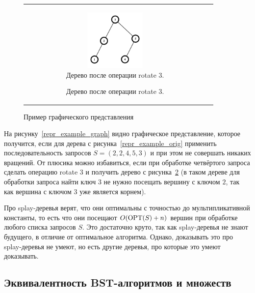 \begin{figure}
\begin{tabular}{cc}
\begin{subfigure}{0.4\textwidth}
        \begin{subfigure}{0.4\textwidth}
        \includegraphics[height=3cm]{img/tree_rebuild.png} 
        \caption{Дерево после операции \textrm{rotate 3}.}
        \label{repr_example_rebuild}
        \end{subfigure}
    \end{subfigure}
    
    \\
    \end{tabular}
    \caption{Пример графического представления}
    \label{repr_example}
\end{figure}

На рисунку~\ref{repr_example_graph} видно графическое представление, которое получится, 
если для дерева с рисунка~\ref{repr_example_orig}
применить последовательность запросов $S = (2, 2, 4, 5, 3)$ и при этом не совершать
никаких вращений. От плюсика можно избавиться, если 
при обработке четвёртого запроса сделать операцию \textrm{rotate 3} и получить дерево с рисунка~\ref{repr_example_rebuild} (в таком дереве для обработки запроса \textrm{найти ключ 3} не нужно посещать вершину с ключом $2$, так как вершина с ключом $3$ уже является корнем).

Про splay-деревья верят, что они оптимальны с точностью до мультипликативной константы,
то есть что они посещают $O(\operatorname{OPT}(S) + n)$ вершин при обработке любого списка запросов $S$.
Это достаточно круто, так как splay-деревья не знают будущего,
в отличие от оптимальное алгоритма. Однако, доказывать это про splay-деревья не умеют,
но есть другие деревья, про которые это умеют доказывать.



\subsection{Эквивалентность BST-алгоритмов и \arbs множеств}

